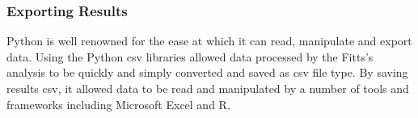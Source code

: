 		\subsubsection{Exporting Results}
			Python is well renowned for the ease at which it can read, manipulate and export data. Using the Python csv libraries allowed data processed by the Fitts’s analysis to be quickly and simply converted and saved as csv file type. By saving results csv, it allowed data to be read and manipulated by a number of tools and frameworks including Microsoft Excel and R.
	
\newpage